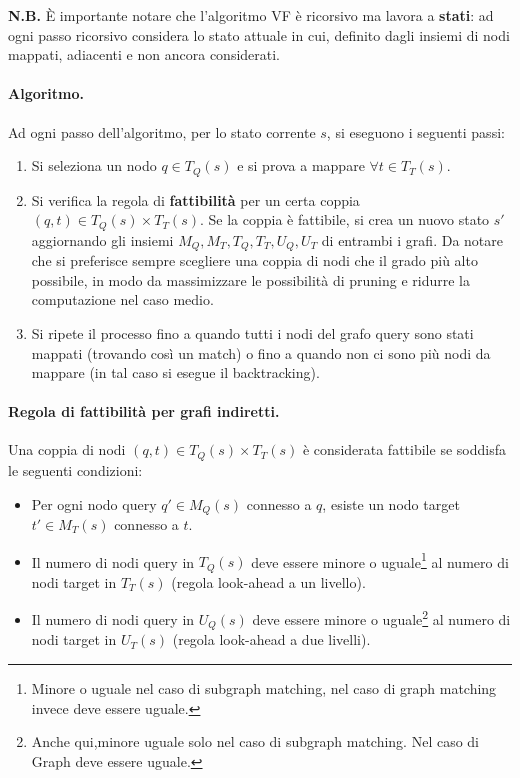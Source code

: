 \textbf{N.B.} È importante notare che l'algoritmo VF è ricorsivo ma lavora a \textbf{stati}: ad ogni passo ricorsivo considera lo stato attuale in cui, definito dagli insiemi di nodi mappati, adiacenti e non ancora considerati.

\paragraph{Algoritmo.}
Ad ogni passo dell'algoritmo, per lo stato corrente $s$, si eseguono i seguenti passi:
\begin{enumerate}
    \item Si seleziona un nodo $q \in T_Q(s)$ e si prova a mappare $\forall t \in T_T(s)$.
    \item Si verifica la regola di \textbf{fattibilità} per un certa coppia $(q, t) \in T_Q(s) \times T_T(s)$. Se la coppia è fattibile, si crea un nuovo stato $s'$ aggiornando gli insiemi $M_Q, M_T, T_Q, T_T, U_Q, U_T$ di entrambi i grafi. Da notare che si preferisce sempre scegliere una coppia di nodi che il grado più alto possibile, in modo da massimizzare le possibilità di pruning e ridurre la computazione nel caso medio.
    \item Si ripete il processo fino a quando tutti i nodi del grafo query sono stati mappati (trovando così un match) o fino a quando non ci sono più nodi da mappare (in tal caso si esegue il backtracking).
\end{enumerate}

\paragraph{Regola di fattibilità per grafi indiretti.}
Una coppia di nodi $(q, t) \in T_Q(s) \times T_T(s)$ è considerata fattibile se soddisfa le seguenti condizioni:
\begin{itemize}
    \item Per ogni nodo query $q' \in M_Q(s)$ connesso a $q$, esiste un nodo target $t' \in M_T(s)$ connesso a $t$.
    \item Il numero di nodi query in $T_Q(s)$ deve essere minore o uguale\footnote{Minore o uguale nel caso di subgraph matching, nel caso di graph matching invece deve essere uguale.} al numero di nodi target in $T_T(s)$ (regola look-ahead a un livello).
    \item Il numero di nodi query in $U_Q(s)$ deve essere minore o uguale\footnote{Anche qui,minore uguale solo nel caso di subgraph matching. Nel caso di Graph deve essere uguale.} al numero di nodi target in $U_T(s)$ (regola look-ahead a due livelli).
\end{itemize}

